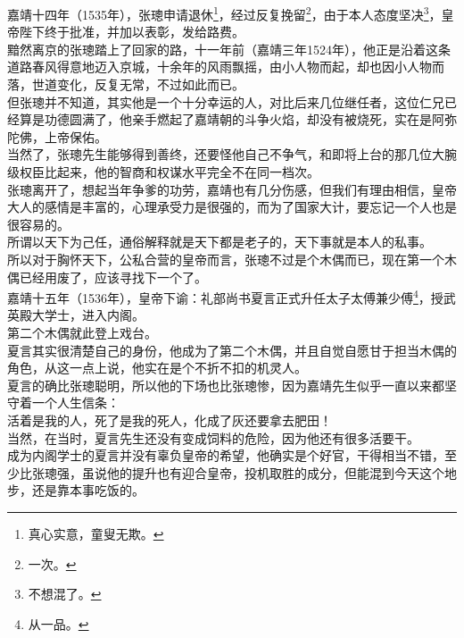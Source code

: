 \begin{multicols}{\theparacolNo}
嘉靖十四年（1535年），张璁申请退休\footnote{真心实意，童叟无欺。}，经过反复挽留\footnote{一次。}，由于本人态度坚决\footnote{不想混了。}，皇帝陛下终于批准，并加以表彰，发给路费。\\

黯然离京的张璁踏上了回家的路，十一年前（嘉靖三年1524年），他正是沿着这条道路春风得意地迈入京城，十余年的风雨飘摇，由小人物而起，却也因小人物而落，世道变化，反复无常，不过如此而已。\\

但张璁并不知道，其实他是一个十分幸运的人，对比后来几位继任者，这位仁兄已经算是功德圆满了，他亲手燃起了嘉靖朝的斗争火焰，却没有被烧死，实在是阿弥陀佛，上帝保佑。\\

当然了，张璁先生能够得到善终，还要怪他自己不争气，和即将上台的那几位大腕级权臣比起来，他的智商和权谋水平完全不在同一档次。\\

张璁离开了，想起当年争爹的功劳，嘉靖也有几分伤感，但我们有理由相信，皇帝大人的感情是丰富的，心理承受力是很强的，而为了国家大计，要忘记一个人也是很容易的。\\

所谓以天下为己任，通俗解释就是天下都是老子的，天下事就是本人的私事。\\

所以对于胸怀天下，公私合营的皇帝而言，张璁不过是个木偶而已，现在第一个木偶已经用废了，应该寻找下一个了。\\

嘉靖十五年（1536年），皇帝下谕：礼部尚书夏言正式升任太子太傅兼少傅\footnote{从一品。}，授武英殿大学士，进入内阁。\\

第二个木偶就此登上戏台。\\

夏言其实很清楚自己的身份，他成为了第二个木偶，并且自觉自愿甘于担当木偶的角色，从这一点上说，他实在是个不折不扣的机灵人。\\

夏言的确比张璁聪明，所以他的下场也比张璁惨，因为嘉靖先生似乎一直以来都坚守着一个人生信条：\\

活着是我的人，死了是我的死人，化成了灰还要拿去肥田！\\

当然，在当时，夏言先生还没有变成饲料的危险，因为他还有很多活要干。\\

成为内阁学士的夏言并没有辜负皇帝的希望，他确实是个好官，干得相当不错，至少比张璁强，虽说他的提升也有迎合皇帝，投机取胜的成分，但能混到今天这个地步，还是靠本事吃饭的。\\


\end{multicols}
